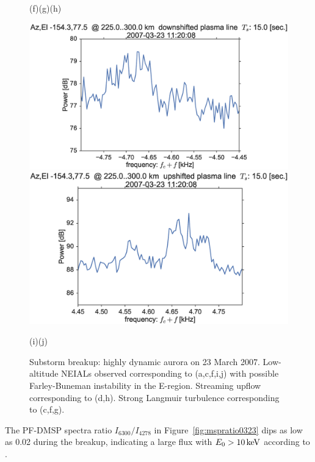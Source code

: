 \begin{figure}
    \vspace{-0.5cm}
    \hspace{0.1cm}(f)\hspace{0.275\columnwidth}(g)\hspace{0.275\columnwidth}(h)
    \vspace{0.1cm}
    
    \includegraphics[width=0.45\columnwidth,trim=0 60 0 0]{gfx/2007-03-23/plasmaDOWNslice2007-03-2311-20-08}
    \includegraphics[width=0.45\columnwidth,trim=0 60 0 0]{gfx/2007-03-23/plasmaUPslice2007-03-2311-20-08}
    
    \vspace{-0.5cm}
    \hspace{0.5cm}(i)\hspace{0.425\columnwidth}(j)
    \vspace{0.5cm}
    
    \caption{Substorm breakup: highly dynamic aurora on 23 March 2007. 
        Low-altitude NEIALs observed corresponding to (a,c,f,i,j) with possible Farley-Buneman instability in the E-region. 
        Streaming upflow corresponding to (d,h).
    Strong Langmuir turbulence corresponding to (c,f,g). }\label{fig:20070323}
\end{figure}
The PF-DMSP spectra ratio $I_{6300}/I_{4278}$ in Figure~\ref{fig:mspratio0323} dips as low as 0.02 during the breakup, indicating a large flux with $E_0 > \unit[10]{keV}$ according to \citet{rees1974}.
